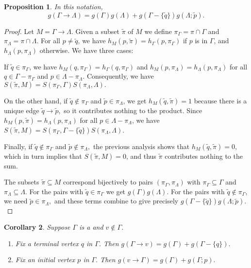 \documentclass{article}
\newenvironment{enumrealm}{\setlength{\abovedisplayskip}{5pt}
\setlength{\belowdisplayskip}{5pt}}{\setlength{\abovedisplayskip}{10.0pt plus 2.0pt minus 5.0pt}
\setlength{\belowdisplayskip}{10.0pt plus 2.0pt minus 5.0pt}}
\newcommand{\qo}{\tilde{q}}
\newcommand{\pin}{\tilde{p}}
\newcommand{\tilpi}{\tilde{\pi}}
\newcommand{\piga}{\pi_\Gamma}
\newcommand{\pila}{\pi_\Lambda}
\theoremstyle{plain}
\newtheorem{prop}{Proposition}[section]
\newtheorem{cor}[prop]{Corollary}
\theoremstyle{definition}
\begin{document}
\begin{prop}
	In this notation, \begin{enumrealm}\begin{equation*} g(\Gamma \rightarrow \Lambda) = g(\Gamma)g(\Lambda) + g(\Gamma - \{\qo\})g(\Lambda; \pin). \end{equation*}\end{enumrealm}
\end{prop}
\begin{proof}
	Let $M = \Gamma \rightarrow \Lambda.$ Given a subset $\tilpi$ of $M$ we define $\piga = \pi \cap \Gamma$ and $\pila = \pi \cap \Lambda$. For all $p \neq \qo$, we have $h_M(p, \tilpi) = h_\Gamma(p, \piga)$ if $p$ is in $\Gamma$, and $h_\Lambda(p, \pila)$ otherwise. We have three cases:
	
	
	If $\qo \in \piga$, we have $h_M(q, \piga) = h_\Gamma(q, \piga)$ and $h_M(p, \pila) = h_\Lambda(p, \pila)$ for all $q \in \Gamma - \piga$ and $p \in \Lambda - \pila$. Consequently, we have $S(\tilpi, M) = S(\piga, \Gamma)S(\pila, \Lambda).$
	
	On the other hand, if $\qo\notin\piga$ and $\pin \in \pila$, we get $h_M(\qo, \tilpi) = 1$ because there is a unique edge $\qo \rightarrow \pin,$ so it contributes nothing to the product. Since $h_M(p, \tilpi) = h_\Lambda(p, \pila)$ for all $p \in \Lambda - \pila$, we have $S(\tilpi, M) = S(\piga, \Gamma - \{\qo\})S(\pila, \Lambda)$.
	
	Finally, if $\qo \notin \piga$ and $\pin\notin\pila,$ the previous analysis shows that $h_M(\qo, \tilpi) = 0$, which in turn implies that $S(\tilpi, M) = 0$, and thus $\tilpi$ contributes nothing to the sum.
	
	The subsets $\tilpi \subseteq M$ correspond bijectively to pairs $(\piga, \pila)$ with $\piga \subseteq \Gamma$ and $\pila \subseteq \Lambda.$ For the pairs with $\qo \in \piga$ we get $g(\Gamma)g(\Lambda)$. For the pairs with $\qo \notin \piga$, we need $\pin \in \pila,$ and these terms combine to give precisely $g(\Gamma - \{\qo\})g(\Lambda; \pin).$
\end{proof}

\begin{cor} Suppose $\Gamma$ is a  and $v \notin \Gamma$.\listspace
	\begin{enumerate} \listspace
		\item Fix a terminal vertex $q$ in $\Gamma$. Then $g(\Gamma \rightarrow v) = g(\Gamma) + g(\Gamma - \{q\}).$
		\item Fix an initial vertex $p$ in $\Gamma.$ Then $g(v \rightarrow \Gamma) = g(\Gamma) + g(\Gamma; p).$
	\end{enumerate}\textspace
\end{cor}
\end{document}
